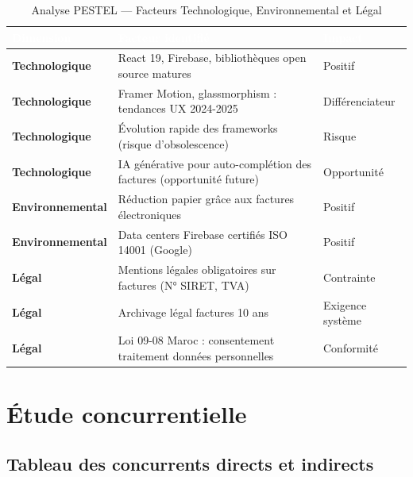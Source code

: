 \documentclass[12pt,a4paper]{report}
\begin{document}
\begin{table}[H]
\centering
\caption{Analyse PESTEL — Facteurs Technologique, Environnemental et Légal}
\label{tab:pestel_tel}
\begin{tabularx}{\textwidth}{|l|X|l|}
\hline
\rowcolor{emsiblue}\textcolor{white}{\textbf{Dimension}} & \textcolor{white}{\textbf{Facteur identifié}} & \textcolor{white}{\textbf{Impact}} \\
\hline
\textbf{Technologique} & React 19, Firebase, bibliothèques open source matures & Positif \\
\textbf{Technologique} & Framer Motion, glassmorphism : tendances UX 2024-2025 & Différenciateur \\
\textbf{Technologique} & Évolution rapide des frameworks (risque d'obsolescence) & Risque \\
\textbf{Technologique} & IA générative pour auto-complétion des factures (opportunité future) & Opportunité \\
\textbf{Environnemental} & Réduction papier grâce aux factures électroniques & Positif \\
\textbf{Environnemental} & Data centers Firebase certifiés ISO 14001 (Google) & Positif \\
\textbf{Légal} & Mentions légales obligatoires sur factures (N° SIRET, TVA) & Contrainte \\
\textbf{Légal} & Archivage légal factures 10 ans & Exigence système \\
\textbf{Légal} & Loi 09-08 Maroc : consentement traitement données personnelles & Conformité \\
\hline
\end{tabularx}
\end{table}

\section{Étude concurrentielle}

\subsection{Tableau des concurrents directs et indirects}
\end{document}
